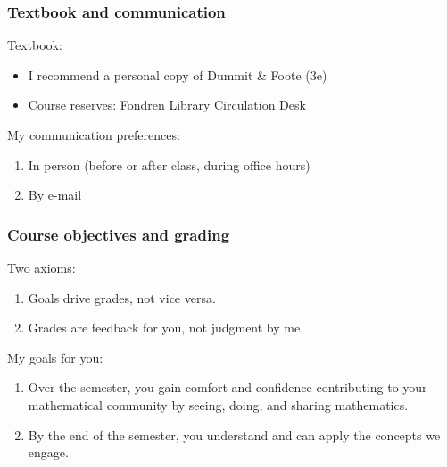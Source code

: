 \documentclass[blue]{beamer}
\begin{document}
\begin{frame}
\frametitle{Textbook and communication}

Textbook:
\begin{itemize}
    \item I recommend a personal copy of Dummit \& Foote (3e)
    \item Course reserves: Fondren Library Circulation Desk
\end{itemize}

\vspace{0.25in}

My communication preferences:
\begin{enumerate}
    \item In person (before or after class, during office hours)
    \item By e-mail
\end{enumerate}
\end{frame}



\begin{frame}
\frametitle{Course objectives and grading}

Two axioms:
\begin{enumerate}
    \item Goals drive grades, not vice versa.
    \item Grades are feedback for you, not judgment by me.
\end{enumerate}

\vspace{0.25in}

My goals for you:
\begin{enumerate}
    \item Over the semester, you gain comfort and confidence contributing to your mathematical community by seeing, doing, and sharing mathematics.
    \item By the end of the semester, you understand and can apply the concepts we engage.
\end{enumerate}
\end{frame}
\end{document}
